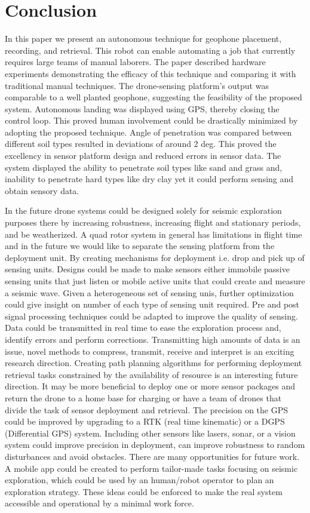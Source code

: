  \section{Conclusion}\label{sec:Conclusion}
In this paper we present an autonomous technique for geophone placement, recording, and retrieval. This robot can enable automating a job that currently requires large teams of manual laborers.
 The paper described hardware experiments demonstrating the efficacy of this technique and comparing it with traditional manual techniques. The drone-sensing platform's output was comparable to a well planted geophone, suggesting the feasibility of the proposed system. Autonomous landing was displayed using GPS, thereby closing the control loop. This proved human involvement could be drastically minimized by adopting the proposed technique. Angle of penetration was compared between different soil types resulted in deviations of around $2$ deg. This proved the excellency in sensor platform design and reduced errors in sensor data. The system displayed the ability to penetrate soil types like sand and grass and, inability to penetrate hard types like dry clay yet it could perform sensing and obtain sensory data.
 
 In the future drone systems could be designed solely for seismic exploration purposes there by increasing robustness, increasing flight and stationary periods, and be weatherized.  
A quad rotor system in general has limitations in flight time and in the future we would like to separate the sensing platform from the deployment unit. By creating mechanisms for deployment i.e. drop and pick up of sensing units. Designs could be made to make sensors either immobile passive sensing units that just listen or mobile active units that could create and measure a seismic wave. Given a heterogeneous set of sensing unis, further optimization could give insight on number of each type of sensing unit required.  Pre and post signal processing techniques could be adapted to improve the quality of sensing. Data could be transmitted in real time to ease the exploration process and, identify errors and perform corrections. Transmitting high amounts of data is an issue, novel methods to compress, transmit, receive and interpret is an exciting research direction. Creating path planning algorithms for performing deployment retrieval tasks constrained by the availability of resource is an interesting future direction. It may be more beneficial to deploy one or more sensor packages and return the drone to a home base for charging or have a team of drones that divide the task of sensor deployment and retrieval. The precision on the GPS could be improved by upgrading to a RTK (real time kinematic) or a DGPS (Differential GPS) system. Including other sensors like lasers, sonar, or a vision system could improve precision in deployment, can improve robustness to random disturbances and avoid obstacles. There are many opportunities for future work. A mobile app could be created to perform tailor-made tasks focusing on seismic exploration, which could be used by an human/robot operator to plan an exploration strategy. These ideas could be enforced to make the real system accessible and operational by a minimal work force.


